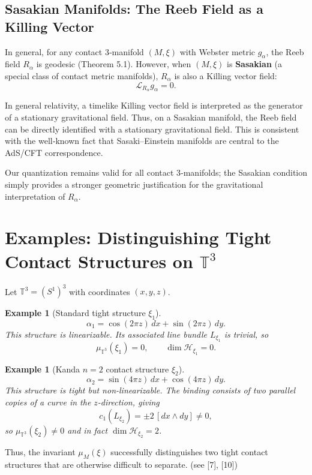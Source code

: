 \documentclass[12pt]{article}
\newtheorem{example}[theorem]{Example}
\newcommand{\T}{\mathbb{T}}
\newcommand{\Hilb}{\mathcal{H}}
\begin{document}
\subsection{Sasakian Manifolds: The Reeb Field as a Killing Vector}

In general, for any contact 3‑manifold $(M,\xi)$ with Webster metric $g_\alpha$, 
the Reeb field $R_\alpha$ is geodesic (Theorem 5.1). However, when $(M,\xi)$ is 
\textbf{Sasakian} (a special class of contact metric manifolds), $R_\alpha$ is also 
a Killing vector field:
\[
\mathcal{L}_{R_\alpha} g_\alpha = 0.
\]

In general relativity, a timelike Killing vector field is interpreted as the generator of 
a stationary gravitational field. Thus, on a Sasakian manifold, the Reeb field can be 
directly identified with a stationary gravitational field. This is consistent with the 
well‑known fact that Sasaki–Einstein manifolds are central to the AdS/CFT correspondence.

Our quantization remains valid for all contact 3‑manifolds; the Sasakian condition 
simply provides a stronger geometric justification for the gravitational interpretation 
of $R_\alpha$.


\section{Examples: Distinguishing Tight Contact Structures on $\T^3$}

Let $\T^3 = (S^1)^3$ with coordinates $(x,y,z)$.

\begin{example}[Standard tight structure $\xi_1$]
\[
\alpha_1 = \cos(2\pi z)\,dx + \sin(2\pi z)\,dy.
\]
This structure is linearizable. Its associated line bundle $L_{\xi_1}$ is trivial, so
\[
\mu_{\T^3}(\xi_1) = 0, \qquad \dim \Hilb_{\xi_1} = 0.
\]
\end{example}

\begin{example}[Kanda $n=2$ contact structure   $\xi_2$]
\[
\alpha_2 = \sin(4\pi z)\,dx + \cos(4\pi z)\,dy.
\]
This structure is tight but non-linearizable. The binding consists of two parallel copies of a curve in the $z$-direction, giving
\[
c_1(L_{\xi_2}) = \pm 2\,[dx \wedge dy] \neq 0,
\]
so $\mu_{\T^3}(\xi_2) \neq 0$ and in fact $\dim \Hilb_{\xi_2} = 2$.  
\end{example}

Thus, the invariant $\mu_M(\xi)$ successfully distinguishes two tight contact structures that are otherwise difficult to separate.  (see [7], [10])
\end{document}
